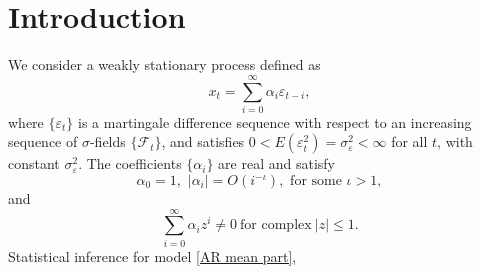 \documentclass[ejsv2]{imsart}
\theoremstyle{plain}
\theoremstyle{definition}
\theoremstyle{remark}
\begin{document}
\begin{frontmatter}
\begin{keyword}[class=MSC]
\end{keyword}

\begin{keyword}
\end{keyword}

\end{frontmatter}

\section{Introduction}\label{sec:1}
We consider a weakly stationary process defined as
\begin{equation}\label{AR mean part}
x_t=\sum_{i=0}^{\infty}\alpha_i\varepsilon_{t-i},
\end{equation}
where
$\{\varepsilon_t\}$ is
a martingale difference sequence
with respect to an increasing sequence of $\sigma$-fields
$\{\mathcal{F}_{t}\}$,
and satisfies
$0<E(\varepsilon_t^2)=\sigma_{\varepsilon}^2<\infty$
for all $t$,
with constant $\sigma_{\varepsilon}^2$.
The coefficients
$\{\alpha_i\}$ are real and satisfy
\begin{equation}\label{alpha rate}
\alpha_0=1,\,\,|\alpha_i|=O(i^{-\iota}), \,\,\textrm{for some}\,\,
\iota >1,
\end{equation}
and
\begin{equation}\label{stationary char poly}
\sum_{i=0}^{\infty}\alpha_iz^i\neq0\ \textrm{for complex}\ |z|\leq1.
\end{equation}
Statistical inference for model \eqref{AR mean part},
\end{document}
